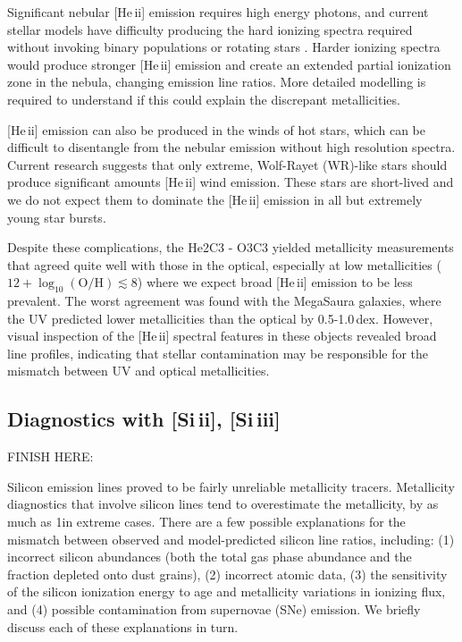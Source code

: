 \documentclass[preprint2]{aastex62}
\newcommand{\heii}{[He\,{\sc ii}]\xspace}
\newcommand{\SiuII}{[Si\,{\sc ii}]\xspace}
\newcommand{\SiuIII}{[Si\,{\sc iii}]\xspace}
\newcommand{\logten}{\ensuremath{\log_{10}}}
\newcommand{\logOH}{\ensuremath{\logten (\mathrm{O}/\mathrm{H})}\xspace}
\newcommand{\mage}{{\sc Meg}a{\sc S}a{\sc ura}\xspace}
\newcommand{\XXX}{{\bf \color{red}{XXX} }}
\begin{document}
Significant nebular \heii emission requires high energy photons, and current stellar models have difficulty producing the hard ionizing spectra required without invoking binary populations or rotating stars \citep[e.g.,][]{Stark+2014, Steidel+2016, Byler+2017}. Harder ionizing spectra would produce stronger \heii emission and create an extended partial ionization zone in the nebula, changing emission line ratios. More detailed modelling is required to understand if this could explain the discrepant metallicities.

\heii emission can also be produced in the winds of hot stars, which can be difficult to disentangle from the nebular emission without high resolution spectra. Current research suggests that only extreme, Wolf-Rayet (WR)-like stars should produce significant amounts \heii wind emission. These stars are short-lived and we do not expect them to dominate the \heii emission in all but extremely young star bursts.

Despite these complications, the He2C3 - O3C3 yielded metallicity measurements that agreed quite well with those in the optical, especially at low metallicities ($12+\logOH \lesssim 8$) where we expect broad \heii emission to be less prevalent. The worst agreement was found with the \mage galaxies, where the UV predicted lower metallicities than the optical by 0.5-1.0\,dex. However, visual inspection of the \heii spectral features in these objects revealed broad line profiles, indicating that stellar contamination may be responsible for the mismatch between UV and optical metallicities.

\subsection{Diagnostics with \SiuII, \SiuIII}

\XXX{FINISH HERE}:

Silicon emission lines proved to be fairly unreliable metallicity tracers.
Metallicity diagnostics that involve silicon lines tend to overestimate the metallicity, by as much as 1\dex in extreme cases. There are a few possible explanations for the mismatch between observed and model-predicted silicon line ratios, including: (1) incorrect silicon abundances (both the total gas phase abundance and the fraction depleted onto dust grains), (2) incorrect atomic data, (3) the sensitivity of the silicon ionization energy to age and metallicity variations in ionizing flux, and (4) possible contamination from supernovae (SNe) emission. We briefly discuss each of these explanations in turn.
\end{document}
